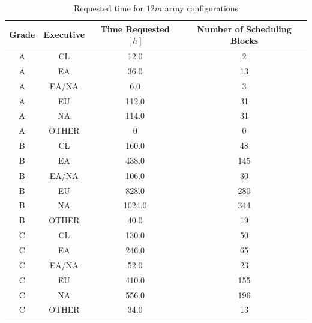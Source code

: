 \begin{table}
\begin{center}
\begin{tabular}{|c|c|c|c|}
\hline
Grade & Executive & Time Requested $[h]$ & Number of Scheduling Blocks \\ \hline
A &	CL		& 12.0  & 2 \\ \hline
A &	EA		& 36.0  & 13 \\ \hline
A &	EA/NA	& 6.0   & 3 \\ \hline
A & EU      & 112.0 & 31 \\ \hline 
A &	NA		& 114.0	& 31 \\ \hline
A & OTHER	& 0		& 0 \\ \hline
B  & CL 	& 160.0		& 48  \\ \hline
B  & EA     & 438.0     & 145 \\ \hline
B  & EA/NA  & 106.0     & 30  \\ \hline
B  & EU     & 828.0     & 280 \\ \hline
B  & NA     & 1024.0    & 344 \\ \hline
B  & OTHER  & 40.0      & 19  \\ \hline
C  & CL     & 130.0     & 50  \\ \hline
C  & EA     & 246.0     & 65  \\ \hline
C  & EA/NA  & 52.0      & 23  \\ \hline
C  & EU     & 410.0     & 155 \\ \hline
C  & NA     & 556.0     & 196 \\ \hline
C  & OTHER  & 34.0      & 13  \\ \hline
\end{tabular}
\end{center}
\caption{Requested time for $12m$ array configurations}
\label{table:requested-time-12m}
\end{table}


